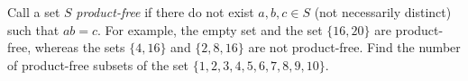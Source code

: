 Call a set $S$ \textit{product-free} if there do not exist $a, b, c \in S$ (not necessarily distinct) such that $a b = c$. For example, the empty set and the set $\{16, 20\}$ are product-free, whereas the sets $\{4, 16\}$ and $\{2, 8, 16\}$ are not product-free. Find the number of product-free subsets of the set $\{1, 2, 3, 4, 5, 6, 7, 8, 9, 10\}$.